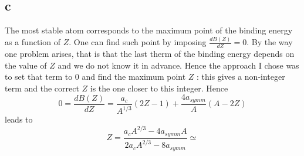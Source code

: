 \subsection*{c}
The most stable atom corresponds to the maximum point of the binding energy as a function of $Z$. One can find such point by imposing $\frac{dB(Z)}{dZ} = 0$. By the way 
one problem arises, that is that the last therm of the binding energy depends on the value of $Z$ and we do not know it in advance. Hence the approach I chose was to set that term to 0 and
find the maximum point $Z$ : this gives a non-integer term and the correct $Z$ is the one closer to this integer. Hence
\begin{equation*}
    0 = \frac{dB(Z)}{dZ} = \frac{a_c}{A^{1/3}} (2Z - 1) + \frac{4a_{symm}}{A} (A - 2Z)
\end{equation*}
leads to 
\begin{equation*}
    Z = \frac{a_c A^{2/3} - 4a_{symm}A}{2a_c A^{2/3} - 8a_{symm}} \simeq 
\end{equation*}

